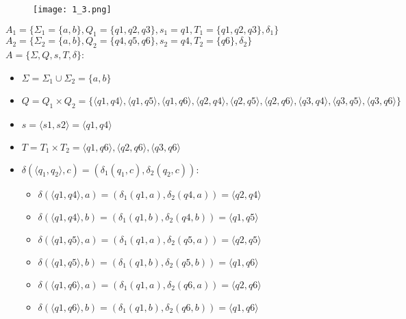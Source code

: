 \documentclass[12pt, a4paper]{article}
\begin{document}
\begin{enumerate}
\begin{comment}
digraph {
    rankdir="LR"
    "" [shape=point]
    q4 [shape=circle]
    q5 [shape=circle]
    q6 [shape=doublecircle]
    
    "" -> q4
    q4 -> q4 [label="a"]
    q4 -> q5 [label="b"]
    q5 -> q5 [label="a"]
    q5 -> q6 [label="b"]
    q6 -> q6 [label="a,b"]
}
\end{comment}

    \begin{figure}[H]
        \centering
        \texttt{[image: 1\_3.png]}
    \end{figure}
    
\(A_1=\{\Sigma_1=\{a,b\}, Q_1=\{q1,q2,q3\}, s_1=q1, T_1=\{q1,q2,q3\}, \delta_1\} \)
\\\(A_2=\{\Sigma_2=\{a,b\}, Q_2=\{q4,q5,q6\}, s_2=q4, T_2=\{q6\}, \delta_2\} \)
\\\(A=\{\Sigma, Q, s, T, \delta\} \):
\begin{itemize}
    \item \(\Sigma=\Sigma_1 \cup \Sigma_2=\{a,b\} \)
    \item \(Q=Q_1 \times Q_2=\{\langle q1,q4 \rangle, \langle q1,q5 \rangle, \langle q1,q6 \rangle, \langle q2,q4 \rangle, \langle q2,q5 \rangle, \langle q2,q6 \rangle, \langle q3,q4 \rangle, \langle q3,q5 \rangle, \langle q3,q6 \rangle\}\)
    \item \(s=\langle s1,s2 \rangle = \langle q1,q4 \rangle\)
    \item \(T=T_1 \times T_2=\langle q1,q6 \rangle, \langle q2,q6 \rangle, \langle q3,q6 \rangle\)
    \item \(\delta(\langle q_1,q_2 \rangle,c)=(\delta_1(q_1,c),\delta_2(q_2,c))\):
    \begin{itemize}
        \item \(\delta(\langle q1,q4 \rangle,a)=(\delta_1(q1,a),\delta_2(q4,a))=\langle q2,q4 \rangle\)
        \item \(\delta(\langle q1,q4 \rangle,b)=(\delta_1(q1,b),\delta_2(q4,b))=\langle q1,q5 \rangle\)
        \item \(\delta(\langle q1,q5 \rangle,a)=(\delta_1(q1,a),\delta_2(q5,a))=\langle q2,q5 \rangle\)
        \item \(\delta(\langle q1,q5 \rangle,b)=(\delta_1(q1,b),\delta_2(q5,b))=\langle q1,q6 \rangle\)
        \item \(\delta(\langle q1,q6 \rangle,a)=(\delta_1(q1,a),\delta_2(q6,a))=\langle q2,q6 \rangle\)
        \item \(\delta(\langle q1,q6 \rangle,b)=(\delta_1(q1,b),\delta_2(q6,b))=\langle q1,q6 \rangle\)
        

\end{itemize}
\end{itemize}
\end{enumerate}
\end{document}

